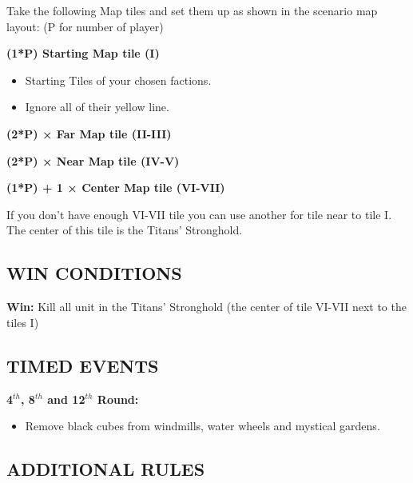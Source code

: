 \begin{multicols*}{2}
Take the following Map tiles and set them up as shown in the scenario map layout: (P for number of player)

\textbf{(1*P) Starting Map tile (I)}
\begin{itemize}
    \item Starting Tiles of your chosen factions.
    \item Ignore all of their yellow line.
\end{itemize}

\textbf{(2*P) × Far Map tile (II-III)}

\textbf{(2*P) × Near Map tile (IV-V)}

\textbf{(1*P) + 1 × Center Map tile (VI-VII)}

If you don't have enough VI-VII tile you can use another for tile near to tile I.
The center of this tile is the Titans' Stronghold.

\subsection*{\MakeUppercase{Win conditions}}

\textbf{Win:} Kill all unit in the Titans' Stronghold (the center of tile VI-VII next to the tiles I)

\subsection*{\MakeUppercase{Timed events}}

\textbf{4$^{th}$, 8$^{th}$ and 12$^{th}$ Round:}
\begin{itemize}
	\item Remove black cubes from windmills, water wheels and mystical gardens.
\end{itemize}

\end{multicols*}

\newpage

\subsection*{\MakeUppercase{Additional rules}}

